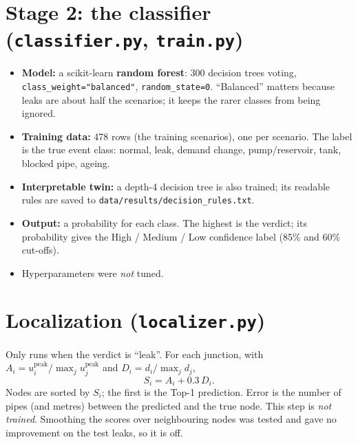 \documentclass[11pt,a4paper]{article}
\newcommand{\code}[1]{\texttt{#1}}
\begin{document}
\section{Stage 2: the classifier (\code{classifier.py}, \code{train.py})}
\begin{itemize}[itemsep=2pt]
\item \textbf{Model:} a scikit-learn \textbf{random forest}: 300 decision trees voting, \code{class\_weight="balanced"}, \code{random\_state=0}. ``Balanced'' matters because leaks are about half the scenarios; it keeps the rarer classes from being ignored.
\item \textbf{Training data:} 478 rows (the training scenarios), one per scenario. The label is the true event class: normal, leak, demand change, pump/reservoir, tank, blocked pipe, ageing.
\item \textbf{Interpretable twin:} a depth-4 decision tree is also trained; its readable rules are saved to \code{data/results/decision\_rules.txt}.
\item \textbf{Output:} a probability for each class. The highest is the verdict; its probability gives the High / Medium / Low confidence label (85\% and 60\% cut-offs).
\item Hyperparameters were \emph{not} tuned.
\end{itemize}

\section{Localization (\code{localizer.py})}
Only runs when the verdict is ``leak''. For each junction, with $A_i=u_i^{\text{peak}}/\max_ju_j^{\text{peak}}$ and $D_i=d_i/\max_jd_j$,
\[S_i=A_i+0.3\,D_i .\]
Nodes are sorted by $S_i$; the first is the Top-1 prediction. Error is the number of pipes (and metres) between the predicted and the true node. This step is \emph{not trained}. Smoothing the scores over neighbouring nodes was tested and gave no improvement on the test leaks, so it is off.
\end{document}
